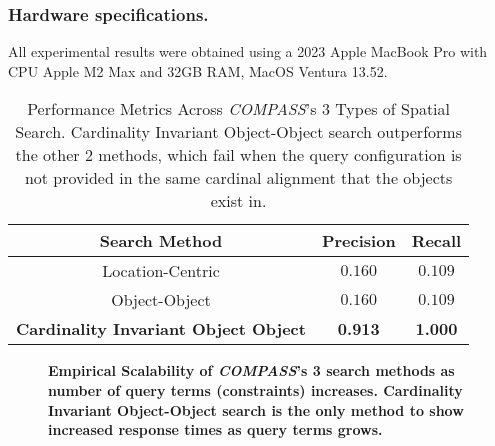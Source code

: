 \subsubsection{Hardware specifications.} 
All experimental results were obtained using a 2023 Apple MacBook Pro with CPU Apple M2 Max and 32GB RAM, MacOS Ventura 13.52.


\small{
\begin{table}[h]
    \begin{center}
        \begin{tabular}{ |c|c|c| } 
            \hline
            Search Method & Precision & Recall\\
            \hline
            Location-Centric & $0.160$ & $0.109$ \\ 
            Object-Object & $0.160$ & $0.109$ \\  
            \textbf{Cardinality Invariant Object Object} & \textbf{0.913} & \textbf{1.000} \\ 
            \hline     
        \end{tabular}
        \caption{Performance Metrics Across \emph{COMPASS}'s 3 Types of Spatial Search. Cardinality Invariant Object-Object search outperforms the other 2 methods, which fail when the query configuration is not provided in the same cardinal alignment that the objects exist in.} 
        \label{Table:PerformanceResults}
    \end{center}
\end{table}
}

\begin{figure}[h]
    \centering
        
    \caption{\textbf{Empirical Scalability of \emph{COMPASS}'s 3 search methods as number of query terms (constraints) increases. Cardinality Invariant Object-Object search is the only method to show increased response times as query terms grows.}}\label{figure:query-time} 
\end{figure}